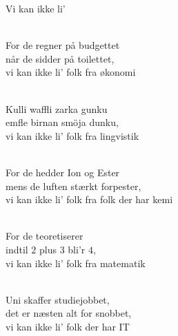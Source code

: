 \begin{song}{Vi kan ikke li'}

  \begin{SBVerse}
    \\
    For de regner på budgettet\\
    når de sidder på toilettet,\\
    vi kan ikke li' folk fra økonomi
  \end{SBVerse}

  \begin{SBVerse}
    \\
    Kulli waffli zarka gunku\\
    emfle birnan smöja dunku,\\
    vi kan ikke li' folk fra lingvistik
  \end{SBVerse}

  \begin{SBVerse}
    \\
    For de hedder Ion og Ester\\
    mens de luften stærkt forpester,\\
    vi kan ikke li' folk fra folk der har kemi
  \end{SBVerse}

 \begin{SBVerse}
    \\
    For de teoretiserer\\
    indtil $2$ plus $3$ bli'r $4$,\\
    vi kan ikke li' folk fra matematik
  \end{SBVerse}

\begin{SBVerse}
    \\
    Uni skaffer studiejobbet,\\
    det er næsten alt for snobbet,\\
    vi kan ikke li' folk der har IT
 \end{SBVerse}



\end{song}

